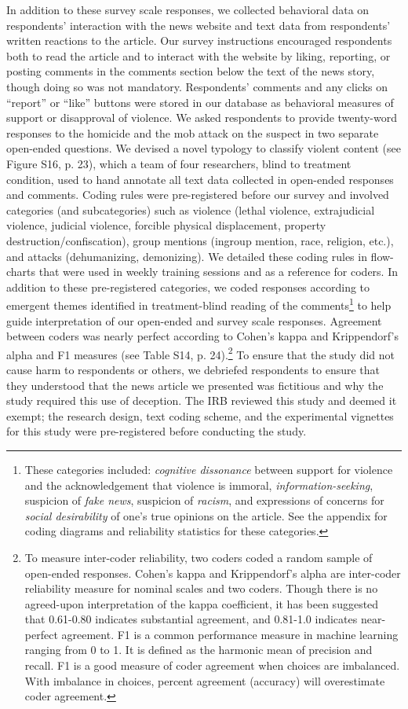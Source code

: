 In addition to these survey scale responses, we collected behavioral data on respondents' interaction with the news website and text data from respondents' written reactions to the article. Our survey instructions encouraged respondents both to read the article and to interact with the website by liking, reporting, or posting comments in the comments section below the text of the news story, though doing so was not mandatory. Respondents' comments and any clicks on ``report'' or ``like'' buttons were stored in our database as behavioral measures of support or disapproval of violence. We asked respondents to provide twenty-word responses to the homicide and the mob attack on the suspect in two separate open-ended questions. We devised a novel typology to classify violent content (see Figure S16, p. 23), which a team of four researchers, blind to treatment condition, used to hand annotate all text data collected in open-ended responses and comments. Coding rules were pre-registered before our survey and involved categories (and subcategories) such as violence (lethal violence, extrajudicial violence, judicial violence, forcible physical displacement, property destruction/confiscation), group mentions (ingroup mention, race, religion, etc.), and attacks (dehumanizing, demonizing). We detailed these coding rules in flow-charts that were used in weekly training sessions and as a reference for coders. In addition to these pre-registered categories, we coded responses according to emergent themes identified in treatment-blind reading of the comments\footnote{These categories included: {\it cognitive dissonance} between support for violence and the acknowledgement that violence is immoral, {\it information-seeking}, suspicion of {\it fake news}, suspicion of {\it racism}, and expressions of concerns for {\it social desirability} of one's true opinions on the article. See the appendix for coding diagrams and reliability statistics for these categories.} to help guide interpretation of our open-ended and survey scale responses. Agreement between coders was nearly perfect according to Cohen's kappa and Krippendorf's alpha and F1 measures (see Table S14, p. 24).\footnote{To measure inter-coder reliability, two coders coded a random sample of open-ended responses. Cohen's kappa and Krippendorf's alpha are inter-coder reliability measure for nominal scales and two coders. Though there is no agreed-upon interpretation of the kappa coefficient, it has been  suggested  that 0.61-0.80 indicates substantial  agreement, and 0.81-1.0 indicates near-perfect agreement. F1 is a common performance measure in machine learning ranging from 0 to 1. It is defined as the harmonic mean of precision and recall. F1 is a good measure of coder agreement when choices are imbalanced. With imbalance in choices, percent agreement (accuracy) will overestimate coder agreement.} To ensure that the study did not cause harm to respondents or others, we debriefed respondents to ensure that they understood that the news article we presented was fictitious and why the study required this use of deception. The IRB reviewed this study and deemed it exempt; the research design, text coding scheme, and the experimental vignettes for this study were pre-registered before conducting the study. 

